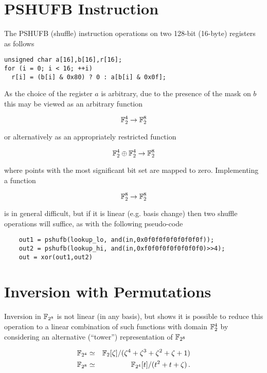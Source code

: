 \documentclass[a4paper]{article}
\numberwithin{equation}{section}
\begin{document}
\section{PSHUFB Instruction}

The PSHUFB (shuffle) instruction operations on two 128-bit (16-byte) registers as follows

\begin{verbatim}
unsigned char a[16],b[16],r[16];
for (i = 0; i < 16; ++i)
  r[i] = (b[i] & 0x80) ? 0 : a[b[i] & 0x0f];
\end{verbatim}

As the choice of the register $a$ is arbitrary, due to the presence of the mask on $b$ this may be viewed as an arbitrary function

	$$ \mathbb{F}_2^4 \rightarrow \mathbb{F}_2^8 $$

or alternatively as an appropriately restricted function

	$$ \mathbb{F}_2^4 \oplus \mathbb{F}_2^4 \rightarrow \mathbb{F}_2^8 $$
	
where points with the most significant bit set are mapped to zero. Implementing a function

  $$\mathbb{F}^8_{2} \rightarrow \mathbb{F}^8_{2}$$
  
is in general difficult, but if it is linear (e.g. basis change) then two shuffle operations will suffice, as with the following pseudo-code

\begin{verbatim}
	out1 = pshufb(lookup_lo, and(in,0x0f0f0f0f0f0f0f0f));
	out2 = pshufb(lookup_hi, and(in,0xf0f0f0f0f0f0f0f0)>>4);
	out = xor(out1,out2)
\end{verbatim}

\section{Inversion with Permutations}

Inversion in $\mathbb{F}_{2^8}$ is not linear (in any basis), but \cite{Hamburg2009AES} shows it is possible to reduce this operation to a linear combination of such functions with domain $\mathbb{F}_2^4$ by considering an alternative (``tower'') representation of $\mathbb{F}_{2^8}$

\begin{eqnarray*}
	\mathbb{F}_{2^4} &\simeq& \mathbb{F}_2[\zeta] / (\zeta^4 + \zeta^3 + \zeta^2 + \zeta + 1) \\
	\mathbb{F}_{2^8} &\simeq& \mathbb{F}_{2^4}[t] / (t^2 + t + \zeta) \, . 
\end{eqnarray*}
\end{document}

